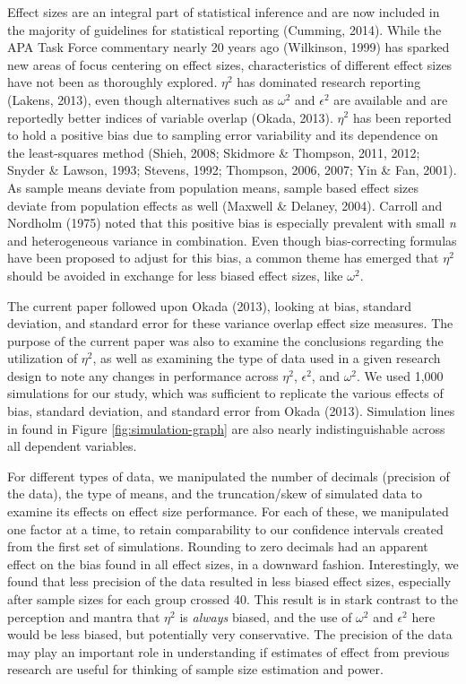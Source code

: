\documentclass[english,man]{apa6}
\theoremstyle{definition}
\theoremstyle{definition}
\theoremstyle{definition}
\theoremstyle{remark}
\begin{document}
Effect sizes are an integral part of statistical inference and are now
included in the majority of guidelines for statistical reporting
(Cumming, 2014). While the APA Task Force commentary nearly 20 years ago
(Wilkinson, 1999) has sparked new areas of focus centering on effect
sizes, characteristics of different effect sizes have not been as
thoroughly explored. \(\eta^2\) has dominated research reporting
(Lakens, 2013), even though alternatives such as \(\omega^2\) and
\(\epsilon^2\) are available and are reportedly better indices of
variable overlap (Okada, 2013). \(\eta^2\) has been reported to hold a
positive bias due to sampling error variability and its dependence on
the least-squares method (Shieh, 2008; Skidmore \& Thompson, 2011, 2012;
Snyder \& Lawson, 1993; Stevens, 1992; Thompson, 2006, 2007; Yin \& Fan,
2001). As sample means deviate from population means, sample based
effect sizes deviate from population effects as well (Maxwell \&
Delaney, 2004). Carroll and Nordholm (1975) noted that this positive
bias is especially prevalent with small \emph{n} and heterogeneous
variance in combination. Even though bias-correcting formulas have been
proposed to adjust for this bias, a common theme has emerged that
\(\eta^2\) should be avoided in exchange for less biased effect sizes,
like \(\omega^2\).

The current paper followed upon Okada (2013), looking at bias, standard
deviation, and standard error for these variance overlap effect size
measures. The purpose of the current paper was also to examine the
conclusions regarding the utilization of \(\eta^2\), as well as
examining the type of data used in a given research design to note any
changes in performance across \(\eta^2\), \(\epsilon^2\), and
\(\omega^2\). We used 1,000 simulations for our study, which was
sufficient to replicate the various effects of bias, standard deviation,
and standard error from Okada (2013). Simulation lines in found in
Figure \ref{fig:simulation-graph} are also nearly indistinguishable
across all dependent variables.

For different types of data, we manipulated the number of decimals
(precision of the data), the type of means, and the truncation/skew of
simulated data to examine its effects on effect size performance. For
each of these, we manipulated one factor at a time, to retain
comparability to our confidence intervals created from the first set of
simulations. Rounding to zero decimals had an apparent effect on the
bias found in all effect sizes, in a downward fashion. Interestingly, we
found that less precision of the data resulted in less biased effect
sizes, especially after sample sizes for each group crossed 40. This
result is in stark contrast to the perception and mantra that \(\eta^2\)
is \emph{always} biased, and the use of \(\omega^2\) and \(\epsilon^2\)
here would be less biased, but potentially very conservative. The
precision of the data may play an important role in understanding if
estimates of effect from previous research are useful for thinking of
sample size estimation and power.
\end{document}
